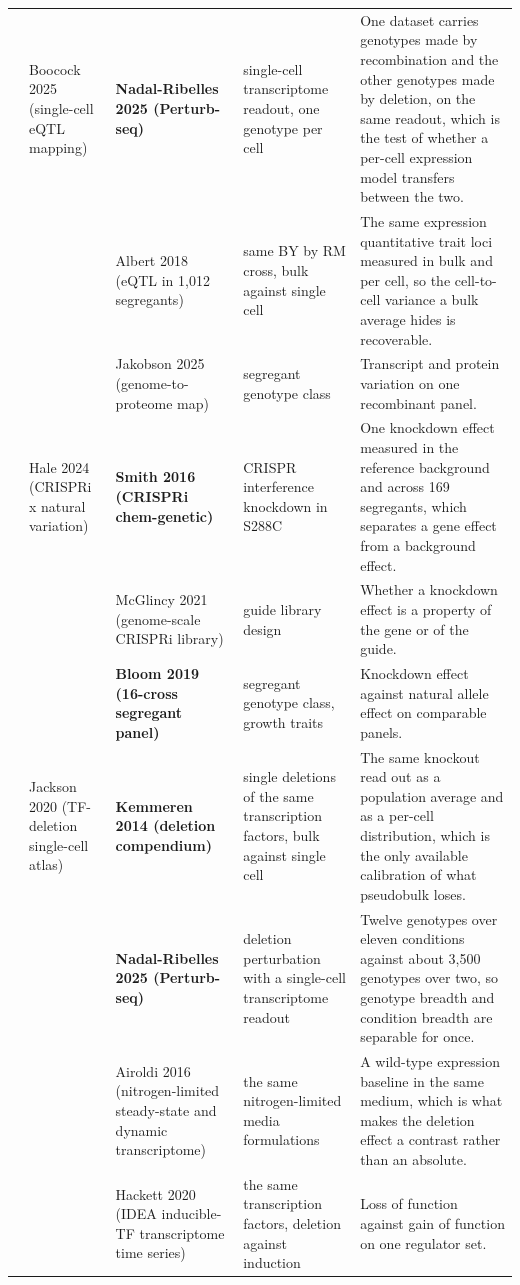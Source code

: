 \begin{landscape}
\begin{longtable}{@{}r@{\hspace{4pt}} L{42mm} L{44mm} L{48mm} L{96mm}@{}}
 & Boocock 2025 (single-cell eQTL mapping) & \textbf{Nadal-Ribelles 2025 (Perturb-seq)} & single-cell transcriptome readout, one genotype per cell & One dataset carries genotypes made by recombination and the other genotypes made by deletion, on the same readout, which is the test of whether a per-cell expression model transfers between the two. \\
 &  & Albert 2018 (eQTL in 1,012 segregants) & same BY by RM cross, bulk against single cell & The same expression quantitative trait loci measured in bulk and per cell, so the cell-to-cell variance a bulk average hides is recoverable. \\
 &  & Jakobson 2025 (genome-to-proteome map) & segregant genotype class & Transcript and protein variation on one recombinant panel. \\
 & Hale 2024 (CRISPRi x natural variation) & \textbf{Smith 2016 (CRISPRi chem-genetic)} & CRISPR interference knockdown in S288C & One knockdown effect measured in the reference background and across 169 segregants, which separates a gene effect from a background effect. \\
 &  & McGlincy 2021 (genome-scale CRISPRi library) & guide library design & Whether a knockdown effect is a property of the gene or of the guide. \\
 &  & \textbf{Bloom 2019 (16-cross segregant panel)} & segregant genotype class, growth traits & Knockdown effect against natural allele effect on comparable panels. \\
 & Jackson 2020 (TF-deletion single-cell atlas) & \textbf{Kemmeren 2014 (deletion compendium)} & single deletions of the same transcription factors, bulk against single cell & The same knockout read out as a population average and as a per-cell distribution, which is the only available calibration of what pseudobulk loses. \\
 &  & \textbf{Nadal-Ribelles 2025 (Perturb-seq)} & deletion perturbation with a single-cell transcriptome readout & Twelve genotypes over eleven conditions against about 3,500 genotypes over two, so genotype breadth and condition breadth are separable for once. \\
 &  & Airoldi 2016 (nitrogen-limited steady-state and dynamic transcriptome) & the same nitrogen-limited media formulations & A wild-type expression baseline in the same medium, which is what makes the deletion effect a contrast rather than an absolute. \\
 &  & Hackett 2020 (IDEA inducible-TF transcriptome time series) & the same transcription factors, deletion against induction & Loss of function against gain of function on one regulator set. \\

\end{longtable}
\end{landscape}
